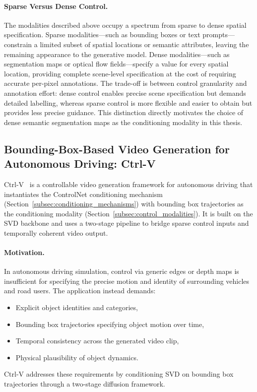 \paragraph{Sparse Versus Dense Control.}
The modalities described above occupy a spectrum from sparse to dense spatial specification. Sparse modalities---such as bounding boxes or text prompts---constrain a limited subset of spatial locations or semantic attributes, leaving the remaining appearance to the generative model. Dense modalities---such as segmentation maps or optical flow fields---specify a value for every spatial location, providing complete scene-level specification at the cost of requiring accurate per-pixel annotations. The trade-off is between control granularity and annotation effort: dense control enables precise scene specification but demands detailed labelling, whereas sparse control is more flexible and easier to obtain but provides less precise guidance. This distinction directly motivates the choice of dense semantic segmentation maps as the conditioning modality in this thesis.

\FloatBarrier

\subsection{Bounding-Box-Based Video Generation for Autonomous Driving: Ctrl-V}
\label{subsec:ctrlv}

Ctrl-V~\cite{luo2025ctrlv} is a controllable video generation framework for autonomous driving that instantiates the ControlNet conditioning mechanism (Section~\ref{subsec:conditioning_mechanisms}) with bounding box trajectories as the conditioning modality (Section~\ref{subsec:control_modalities}). It is built on the SVD backbone and uses a two-stage pipeline to bridge sparse control inputs and temporally coherent video output.

\paragraph{Motivation.}
In autonomous driving simulation, control via generic edges or depth maps is insufficient for specifying the precise motion and identity of surrounding vehicles and road users. The application instead demands:
\begin{itemize}
    \item Explicit object identities and categories,
    \item Bounding box trajectories specifying object motion over time,
    \item Temporal consistency across the generated video clip,
    \item Physical plausibility of object dynamics.
\end{itemize}
Ctrl-V addresses these requirements by conditioning SVD on bounding box trajectories through a two-stage diffusion framework.

